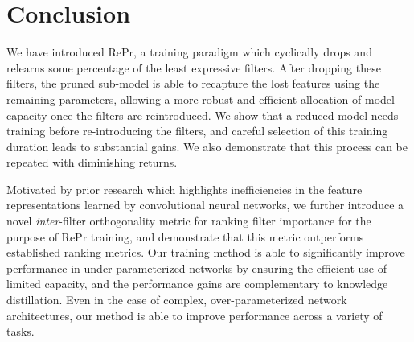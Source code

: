 \section{Conclusion} \label{sec:conclusion}
We have introduced RePr, a training paradigm which cyclically drops and relearns some percentage of the least expressive filters.
After dropping these filters, the pruned sub-model is able to recapture the lost features using the remaining parameters, allowing a more robust and efficient allocation of model capacity once the filters are reintroduced.
We show that a reduced model needs training before re-introducing the filters, and careful selection of this training duration leads to substantial gains. 
We also demonstrate that this process can be repeated with diminishing returns.

Motivated by prior research which highlights inefficiencies in the feature representations learned by convolutional neural networks, we further introduce a novel \textit{inter}-filter orthogonality metric for ranking filter importance for the purpose of RePr training, and demonstrate that this metric outperforms established ranking metrics.
Our training method is able to significantly improve performance in under-parameterized networks by ensuring the efficient use of limited capacity, and the performance gains are complementary to knowledge distillation.
Even in the case of complex, over-parameterized network architectures, our method is able to improve performance across a variety of tasks.
